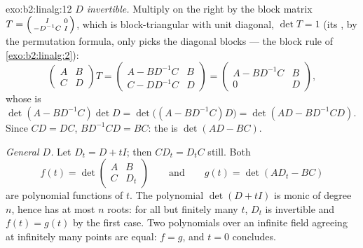 \begin{solution}{exo:b2:linalg:12}
\emph{$D$ invertible.} Multiply on the right by the block matrix
$T = \begin{psmallmatrix} I & 0\\ -D^{-1}C & I\end{psmallmatrix}$,
which is block-triangular with unit diagonal, $\det T = 1$ (its
, by the permutation formula, only picks the diagonal
blocks --- the block rule of \cref{exo:b2:linalg:2}):
\[
\begin{pmatrix} A & B\\ C & D\end{pmatrix} T
= \begin{pmatrix} A - BD^{-1}C & B\\ C - DD^{-1}C & D\end{pmatrix}
= \begin{pmatrix} A - BD^{-1}C & B\\ 0 & D\end{pmatrix},
\]
whose  is $\det(A - BD^{-1}C)\det D = \det\bigl((A -
BD^{-1}C)D\bigr) = \det(AD - BD^{-1}CD)$. Since $CD = DC$,
$BD^{-1}CD = BC$: the  is $\det(AD - BC)$.

\emph{General $D$.} Let $D_t = D + tI$; then $CD_t = D_tC$ still.
Both
\[
f(t) = \det\begin{pmatrix} A & B\\ C & D_t\end{pmatrix}
\qquad\text{and}\qquad
g(t) = \det(AD_t - BC)
\]
are polynomial functions of $t$. The polynomial $\det(D + tI)$ is
monic of degree $n$, hence has at most $n$ roots: for all but
finitely many $t$, $D_t$ is invertible and $f(t) = g(t)$ by the
first case. Two polynomials over an infinite field agreeing at
infinitely many points are equal: $f = g$, and $t = 0$ concludes.
\end{solution}

